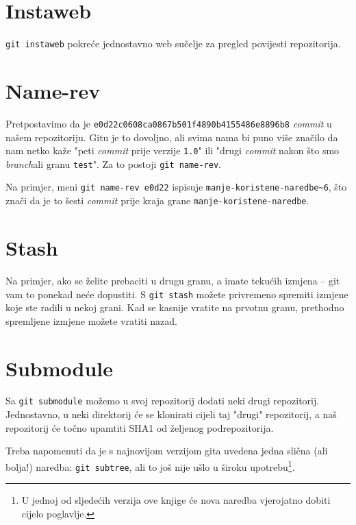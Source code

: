 \section*{Instaweb}

\verb+git instaweb+ pokreće jednostavno web sučelje za pregled povijesti repozitorija.

\section*{Name-rev}

Pretpostavimo da je \verb+e0d22c0608ca0867b501f4890b4155486e8896b8+ \emph{commit} u našem repozitoriju.
Gitu je to dovoljno, ali svima nama bi puno više značilo da nam netko kaže "peti \emph{commit} prije verzije \verb+1.0+" ili "drugi \emph{commit} nakon što smo \emph{branch}ali granu \verb+test+".
Za to postoji \verb+git name-rev+.

Na primjer, meni \verb+git name-rev e0d22+ ispisuje \verb+manje-koristene-naredbe~6+, što znači da je to šesti \emph{commit} prije kraja grane \verb+manje-koristene-naredbe+.

\section*{Stash}

Na primjer, ako se želite prebaciti u drugu granu, a imate tekućih izmjena -- git vam to ponekad neće dopustiti.
S \verb+git stash+ možete privremeno spremiti izmjene koje ste radili u nekoj grani.
Kad se kasnije vratite na prvotnu granu, prethodno spremljene izmjene možete vratiti nazad.

\section*{Submodule}

Sa \verb+git submodule+ možemo u svoj repozitorij dodati neki drugi repozitorij. 
Jednostavno, u neki direktorij će se klonirati cijeli taj "drugi" repozitorij, a naš repozitorij će točno upamtiti SHA1 od željenog podrepozitorija.

Treba napomenuti da je s najnovijom verzijom gita uvedena jedna slična (ali bolja!) naredba: \verb+git subtree+, ali to još nije ušlo u široku upotrebu\footnote{U jednoj od sljedećih verzija ove knjige će nova naredba vjerojatno dobiti cijelo poglavlje.}.

